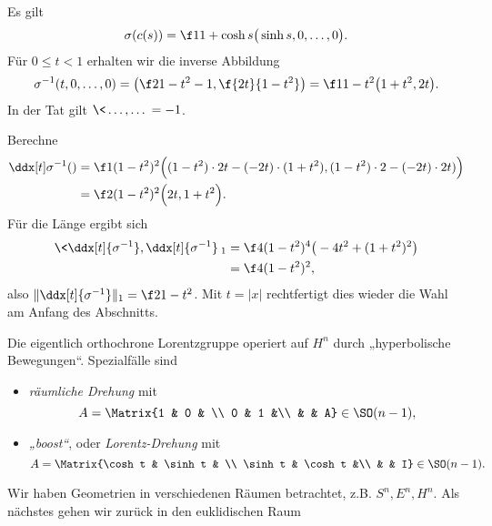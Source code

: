 Es gilt
\[
	\sigma(c(s)) = \f 1{1 + \cosh s} \big( \sinh s, 0, \dots, 0 \big).
\]
Für $0 \le t < 1$ erhalten wir die inverse Abbildung
\[
	\sigma^{-1}(t, 0, \dotsc, 0)
	= \big( \f 2{1 - t^2} - 1, \f {2t}{1-t^2} \big)
	= \f 1{1-t^2} \big( 1 + t^2, 2t \big).
\]
In der Tat gilt $\< \dotsc, \dotsc \> = -1$.

Berechne
\begin{align*}
	\ddx[t] \sigma^{-1}()
	&= \f 1{(1-t^2)^2} \Big( (1-t^2) \cdot 2t - (-2t)\cdot (1 + t^2), (1-t^2) \cdot 2 - (-2t)\cdot 2t) \Big) \\
	&= \f 2{(1-t^2)^2} \Big( 2t, 1 + t^2 \Big).
\end{align*}
Für die Länge ergibt sich
\begin{align*}
	\< \ddx[t]{\sigma^{-1}}, \ddx[t]{\sigma^{-1}} \>_1
	&= \f 4{(1-t^2)^4} \big( - 4t^2 + (1+t^2)^2 \big) \\
	&= \f 4{(1-t^2)^2},
\end{align*}
also $\|\ddx[t]{\sigma^{-1}}\|_1 = \f 2{1-t^2}$.
Mit $t = |x|$ rechtfertigt dies wieder die Wahl am Anfang des Abschnitts.

\begin{nt}
	Die eigentlich orthochrone Lorentzgruppe operiert auf $H^n$ durch „hyperbolische Bewegungen“.
	Spezialfälle sind
	\begin{itemize}
		\item
			\emph{räumliche Drehung} mit
			\[
				A = \Matrix{1 & 0 &  \\ 0 & 1 &\\ & & A} \in \SO(n-1),
			\]
		\item
			\emph{„boost“}, oder \emph{Lorentz-Drehung} mit
			\[
				A = \Matrix{\cosh t & \sinh t &  \\ \sinh t & \cosh t &\\ & & I} \in \SO(n-1).
			\]
	\end{itemize}
\end{nt}


Wir haben Geometrien in verschiedenen Räumen betrachtet, z.B. $S^n, E^n, H^n$.
Als nächstes gehen wir zurück in den euklidischen Raum




